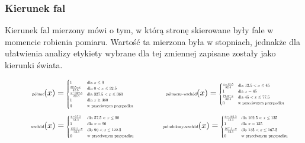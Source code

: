 \documentclass{article}
\begin{document}
\subsubsection{Kierunek fal}

\noindent Kierunek fal mierzony mówi o tym, w którą stronę skierowane były fale w momencie robienia pomiaru. Wartość ta mierzona była w stopniach, jednakże dla ułatwienia analizy etykiety wybrane dla tej zmiennej zapisane zostały jako kierunki świata.

\begin{equation*}
\begin{minipage}{0.5\textwidth}
\centering
$\text{\scalebox{0.5}{północ}}(x) =
\scalebox{0.5}{$
\begin{cases}
1 & \text{dla } x \leq 0 \\
\frac{32.5 - x}{32.5} & \text{dla } 0 < x \leq 32.5 \\
\frac{x - 327.5}{32.5} & \text{dla } 327.5 < x \leq 360 \\
1 & \text{dla } x \geq 360 \\
0 & \text{w przeciwnym przypadku}
\end{cases}
$}$
\end{minipage}%
\begin{minipage}{0.5\textwidth}
\centering
$\text{\scalebox{0.5}{północny-wschód}}(x) =
\scalebox{0.5}{$
\begin{cases}
\frac{x - 12.5}{32.5} & \text{dla } 12.5 < x \leq 45 \\
1 & \text{dla } x = 45 \\
\frac{77.5 - x}{32.5} & \text{dla } 45 < x \leq 77.5 \\
0 & \text{w przeciwnym przypadku}
\end{cases}
$}$
\end{minipage}
\end{equation*}
\begin{equation*}
\begin{minipage}{0.5\textwidth}
\centering
$\text{\scalebox{0.5}{wschód}}(x) =
\scalebox{0.5}{$
\begin{cases}
\frac{x - 57.5}{32.5} & \text{dla } 57.5 < x \leq 90 \\
1 & \text{dla } x = 90 \\
\frac{122.5 - x}{32.5} & \text{dla } 90 < x \leq 122.5 \\
0 & \text{w przeciwnym przypadku}
\end{cases}
$}$
\end{minipage}%
\begin{minipage}{0.5\textwidth}
\centering
$\text{\scalebox{0.5}{południowy-wschód}}(x) =
\scalebox{0.5}{$
\begin{cases}
\frac{x - 102.5}{32.5} & \text{dla } 102.5 < x \leq 135 \\
1 & \text{dla } x = 135 \\
\frac{167.5 - x}{32.5} & \text{dla } 135 < x \leq 167.5 \\
0 & \text{w przeciwnym przypadku}
\end{cases}
$}$
\end{minipage}
\end{equation*}
\end{document}

